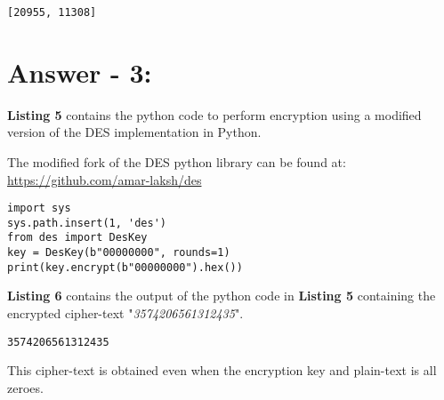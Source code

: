 \documentclass[10pt,a4paper,oneside]{article}
\begin{document}
\begin{lstlisting}
[20955, 11308]
\end{lstlisting}

\section*{Answer - 3:}

\textbf{Listing 5} contains the python code to perform encryption using a modified version of the DES implementation in Python.

The modified fork of the DES python library can be found at:\linebreak
\href{https://github.com/amar-laksh/des}{https://github.com/amar-laksh/des}

\begin{lstlisting}
import sys
sys.path.insert(1, 'des')
from des import DesKey
key = DesKey(b"00000000", rounds=1)
print(key.encrypt(b"00000000").hex())
\end{lstlisting}
\textbf{Listing 6} contains the output of the python code in \textbf{Listing 5} containing the encrypted cipher-text "\textit{3574206561312435}". 

\begin{lstlisting}
3574206561312435
\end{lstlisting}
This cipher-text is obtained even when the encryption key and plain-text is all zeroes.
\end{document}
